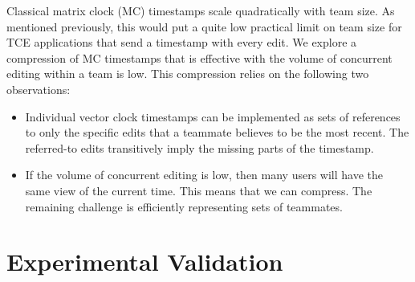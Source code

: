 \documentclass[runningheads]{llncs}
\begin{document}
Classical matrix clock (MC) timestamps scale quadratically with team size.
As mentioned previously, this would put a quite low practical limit on team size for TCE applications that send a timestamp with every edit.
We explore a compression of MC timestamps that is effective with the volume of concurrent editing within a team is low.
This compression relies on the following two observations:

\begin{itemize}
  \item Individual vector clock timestamps can be implemented as sets of references to only the specific edits that a teammate believes to be the most recent.
    The referred-to edits transitively imply the missing parts of the timestamp.
  \item If the volume of concurrent editing is low, then many users will have the same view of the current time.
    This means that we can compress.
    The remaining challenge is efficiently representing sets of teammates.
\end{itemize}

\section{Experimental Validation}

\section{}

\end{document}
